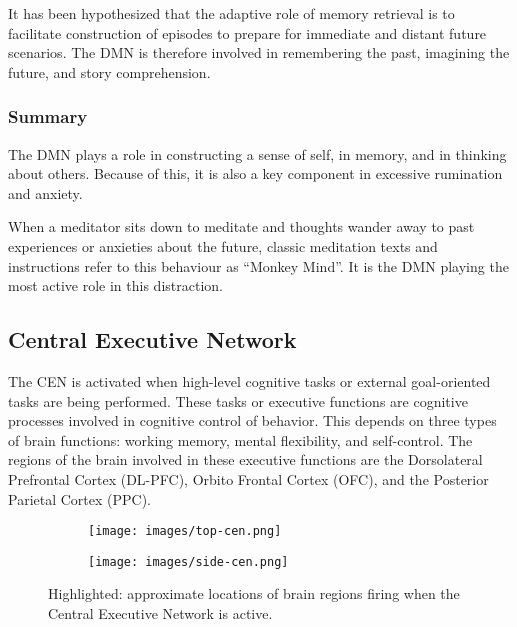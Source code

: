 \documentclass[a4paper, amsfonts, amssymb, amsmath, reprint, showkeys, nofootinbib, twoside]{revtex4-1}
\begin{document}
It has been hypothesized that the adaptive role of memory retrieval is to facilitate
construction of episodes to prepare for immediate and distant future scenarios. \cite{defaultnetworkadaptive}
The DMN is therefore involved in remembering the past, imagining the future, and story
comprehension. \cite{defaultnetworkadaptive}

\subsubsection{Summary}

The DMN plays a role in constructing a sense of self, in memory,
and in thinking about others. Because of this, it is also a key component in excessive
rumination and anxiety. \cite{dmndepression}

When a meditator sits down to meditate and thoughts wander away to past experiences
or anxieties about the future, classic meditation texts and instructions refer to
this behaviour as ``Monkey Mind''. It is the DMN playing the most active role in this
distraction.

\subsection{Central Executive Network}

The CEN is activated when high-level cognitive tasks or external goal-oriented tasks
are being performed. These tasks or executive functions are cognitive processes involved in
cognitive control of behavior. This depends on three types of brain functions:
working memory, mental flexibility, and self-control. The regions of the brain
involved in these executive functions are the Dorsolateral Prefrontal Cortex
(DL-PFC), Orbito Frontal Cortex (OFC), and the Posterior Parietal Cortex (PPC).

\begin{figure}[h!]
  \centering
  \begin{subfigure}[b]{0.48\linewidth}
    \texttt{[image: images/top-cen.png]}
  \end{subfigure}
  \begin{subfigure}[b]{0.48\linewidth}
    \texttt{[image: images/side-cen.png]}
  \end{subfigure}
  \caption{Highlighted: approximate locations of brain regions firing when the Central Executive Network is active.}
  \label{fig:cen}
\end{figure}
\end{document}
